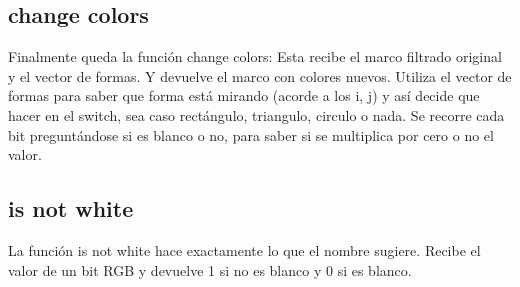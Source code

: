 \subsection{change colors}
Finalmente queda la funci\'on change colors:
Esta recibe el marco filtrado original y el vector de formas. Y devuelve el marco con colores nuevos.
Utiliza el vector de formas para saber que forma est\'a mirando (acorde a los i, j) y así decide que hacer en el switch, sea caso rectángulo, triangulo, circulo o nada.
Se recorre cada bit preguntándose si es blanco o no, para saber si se multiplica por cero o no el valor.


\subsection{is not white}
La funci\'on is not white hace exactamente lo que el nombre sugiere. Recibe el valor de un bit RGB y devuelve 1 si no es blanco y 0 si es blanco.




